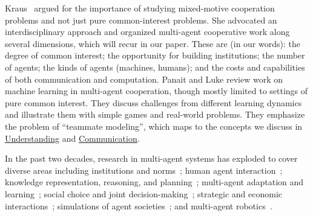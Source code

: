 \documentclass[11pt, a4paper, logo, onecolumn, nonumbering]{deepmind}
\begin{document}
Kraus~\cite{kraus1997negotiation} argued for the importance of studying mixed-motive cooperation problems and not just pure common-interest problems. She advocated an interdisciplinary approach and organized multi-agent cooperative work along several dimensions, which will recur in our paper. These are (in our words): the degree of common interest; the opportunity for building institutions; the number of agents; the kinds of agents (machines, humans); and the costs and capabilities of both communication and computation.
Panait and Luke \cite{panait2005cooperative} review work on machine learning in multi-agent cooperation, 
though mostly limited to settings of pure common interest. 
They discuss challenges from different learning dynamics and illustrate them with simple games and real-world problems. They emphasize the problem of ``teammate modeling'', which maps to the concepts we discuss in \hyperref[section:understanding]{Understanding} and \hyperref[section:communication]{Communication}. 

In the past two decades, research in multi-agent systems has exploded to cover diverse areas including %
institutions and norms~\cite{robertson2004multi,boella2006introduction,argente2006multi}; human agent interaction~\cite{lewis1998designing,guzzoni2007modeling,bradshaw2011human,sierhuis2003human}; knowledge representation, reasoning, and planning~\cite{georgeff1988communication,van2002tractable,van2008handbook}; multi-agent adaptation and learning~\cite{weiss1995adaptation,georgeff1998belief,alonso2003adaptive,
bowling2005convergence,shoham2007if,busoniu2008comprehensive}; social choice and joint decision-making~\cite{pitt2006voting,chevaleyre2007short,brandt2012computational}; strategic and economic interactions~\cite{rosenschein1994rules,nisan2001algorithmic,kraus2001strategic,parsons2002game,wellman20032001,wellman2015economic};  simulations of agent societies~\cite{minar1996swarm,artikis2001formal,neville2008presage}; and multi-agent robotics~\cite{kitano1997robocup,burgard2000collaborative,arai2002advances,gerkey2004formal}.
\end{document}

